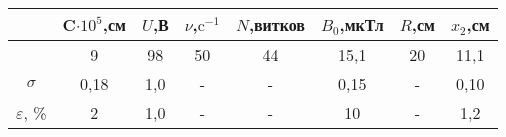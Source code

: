 \begin{tabular}{cccccccc}
	\toprule
	& C$ \cdot10^5$,\;см&$U$,\;В&$\nu$,\;$\text{c}^{-1}$&$N$,\;витков&$B_0$,\;мкТл&$R$,\;см&$x_2$,\;см\\
	\midrule
	&9              &98   &50      &44        &15,1      &20    &11,1    \\
	$\sigma$         &0,18           &1,0  &-       &-         &0,15      &-     &0,10    \\
	$\varepsilon$, \%&2              &1,0  &-       &-         &10        &-     &1,2     \\
	\bottomrule
\end{tabular}